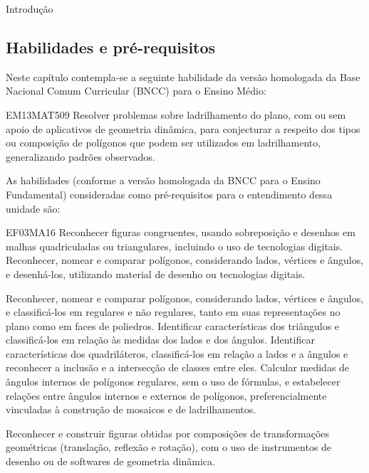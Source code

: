\mainmatter

\begin{apresentacao}{Introdução}
\subsection *{Habilidades e pré-requisitos}

Neste capítulo contempla-se a seguinte habilidade da versão homologada da Base Nacional Comum Curricular (BNCC) para o Ensino Médio:

\begin{habilities}{EM13MAT509}
Resolver problemas sobre ladrilhamento do plano, com ou sem apoio de aplicativos de geometria dinâmica, para conjecturar a respeito dos tipos ou composição de polígonos que podem ser utilizados em ladrilhamento, generalizando padrões observados.
\end{habilities}

 
As habilidades (conforme a versão homologada da BNCC para o Ensino Fundamental) consideradas como pré-requisitos para o entendimento dessa unidade são:

\begin{habilities}{EF03MA16}
Reconhecer figuras congruentes, usando sobreposição e desenhos em malhas quadriculadas ou triangulares, incluindo o uso de tecnologias digitais.
 Reconhecer, nomear e comparar polígonos, considerando lados, vértices e ângulos, e desenhá-los, utilizando material de desenho ou tecnologias digitais.

 Reconhecer, nomear e comparar polígonos, considerando lados, vértices e ângulos, e classificá-los em regulares e não regulares, tanto em suas representações no plano como em faces de poliedros.
 Identificar características dos triângulos e classificá-los em relação às medidas dos lados e dos ângulos.
 Identificar características dos quadriláteros, classificá-los em relação a lados e a ângulos e reconhecer a inclusão e a intersecção de classes entre eles.
 Calcular medidas de ângulos internos de polígonos regulares, sem o uso de fórmulas, e estabelecer relações entre ângulos internos e externos de polígonos,
preferencialmente vinculadas à construção de mosaicos e de ladrilhamentos.

 Reconhecer e construir figuras obtidas por composições de transformações geométricas (translação, reflexão e rotação), com o uso de instrumentos de desenho ou de softwares de geometria dinâmica.
\end{habilities}





\end{apresentacao}
